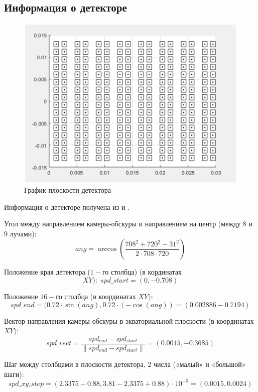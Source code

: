 \documentclass[a4]{article}
\begin{document}
\subsection{Информация о детекторе}
\begin{figure}[H]
\begin{center}
\caption{График плоскости детектора}
\includegraphics{pic1.png} 
\end{center}
\end{figure}

Информация о детекторе получена из \cite{source1} и \cite{source2}.


Угол между направлением камеры-обскуры и направлением на центр (между $8$ и $9$ лучами): $$ang = \arccos\left(\frac{708^2 + 720^2 - 31^2}{2\cdot 708\cdot 720}\right)$$
\vspace{1mm}

Положение края детектора ($1-$го столбца) (в кординатах $$XY):\;spd\_start=(0,-0.708)$$
\vspace{1mm}

Положение $16-$го столбца (в координатах $XY):$
$$spd\_end=(0.72\cdot\sin(ang),0.72\cdot(-\cos( ang))=(0.002886-0.7194)$$
\vspace{1mm}

Вектор направления камеры-обскуры в экваториальной плоскости (в координатах $XY):$
$$spd\_vect=\frac{spd_{end}-spd_{start}}{\|spd_{end}-spd_{start}\|}= (0.0015,-0.3685)$$
\vspace{1mm}

Шаг между столбцами в плоскости детектора, 2 числа («малый» и «большой» шаги): 
$$spd\_xy\_step=(2.3375 - 0.88,3.81 - 2.3375 + 0.88)\cdot 10^{-3}=(0.0015,0.0024)$$
\vspace{1mm}
\end{document}
